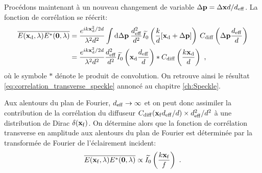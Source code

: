 Procédons maintenant à un nouveau changement de variable $\Delta\mathbf{p}=\Delta\mathbf{x} d/d_{\mathrm{eff}}$. La fonction de corrélation se réécrit:
\begin{align}
\overline{E(\mathbf{x}_{\mathrm{d}},\lambda) E^*(\mathbf{0},\lambda)}&= \frac{e^{ik \mathbf{x}_{\mathrm{d}}^2/2d}}{\lambda^2 d^2} \int{\mathop{}\mathopen{}\mathrm{d}\Delta\mathbf{p} \:\frac{d_{\mathrm{eff}}^2}{d^2} \widetilde{I_0}\left( \frac{k}{d}[\mathbf{x}_{\mathrm{d}}+\Delta\mathbf{p}]\right) \: C_{\mathrm{diff}}\left( \Delta\mathbf{p}\frac{d_{\mathrm{eff}}}{d}\right)}\\
&=\frac{e^{ik \mathbf{x}_{\mathrm{d}}^2/2d}}{\lambda^2 d^2} \frac{d_{\mathrm{eff}}^2}{d^2} \widetilde{I_0}\left(\mathbf{x}_{\mathrm{d}}\frac{d_{\mathrm{eff}}}{d} \right) \ast C_{\mathrm{diff}}\left(\frac{k\mathbf{x}_{\mathrm{d}}}{d}\right) \text{ ,}
\end{align}
où le symbole $\ast$ dénote le produit de convolution. On retrouve ainsi le résultat \ref{eq:correlation_transverse_speckle} annoncé au chapitre \ref{ch:Speckle}. 

Aux alentours du plan de Fourier, $d_{\mathrm{eff}}\rightarrow\infty$ et on peut donc assimiler la contribution de la corrélation du diffuseur $C_{\mathrm{diff}}(\mathbf{x}_{\mathrm{f}}d_{\mathrm{eff}}/d) \times d_{\mathrm{eff}}^2/d^2$ à une distribution de Dirac $\delta(\mathbf{x}_{\mathrm{f}})$. On détermine alors que la fonction de corrélation transverse en amplitude aux alentours du plan de Fourier est déterminée par la transformée de Fourier de l'éclairement incident:
\begin{equation}
\overline{E(\mathbf{x}_{\mathrm{f}},\lambda)E^*(\mathbf{0},\lambda)} \propto \widetilde{I_0}\left(\frac{k\mathbf{x}_{\mathrm{f}}}{f} \right) \text{ .}
\end{equation}




